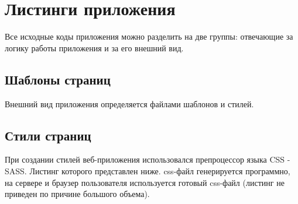 \section{Листинги приложения}

Все исходные коды приложения можно разделить на две группы: отвечающие за логику работы приложения и за его внешний вид.


\subsection{Шаблоны страниц}

Внешний вид приложения определяется файлами шаблонов и стилей.


\subsection{Стили страниц}

При создании стилей веб-приложения использовался препроцессор языка CSS - SASS. Листинг которого представлен ниже. css-файл генерируется программно, на сервере и браузер пользователя используется готовый css-файл (листинг не приведен по причине большого объема).

